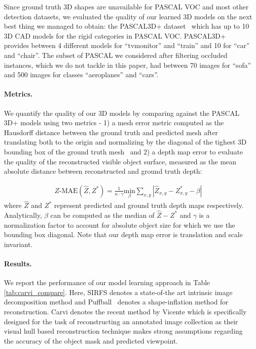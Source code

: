 Since ground truth 3D shapes are unavailable for PASCAL VOC and most other detection datasets, we evaluated the quality of our learned 3D models on the next best thing we managed to obtain: the PASCAL3D+ dataset~\cite{pascal3d} which has up to 10 3D CAD models for the rigid categories in PASCAL VOC. PASCAL3D+ provides between 4 different models for ``tvmonitor'' and ``train'' and 10 for ``car'' and ``chair''.
The subset of PASCAL we considered after filtering occluded instances, which we do not tackle in this paper, had between 70 images for ``sofa'' and 500 images for classes ``aeroplanes'' and ``cars''.


\paragraph{Metrics.} We quantify the quality of our 3D models by comparing against the PASCAL 3D+ models using two metrics - 1) a mesh error metric computed as the Hausdorff distance between the ground truth and predicted mesh after translating both to the origin and normalizing by the diagonal of the tighest 3D bounding box of the ground truth mesh~\cite{aspert2002mesh} and 2) a depth map error to evaluate the quality of the reconstructed visible object surface, measured as the mean absolute distance between reconstructed and ground truth depth:

\begin{gather}
 Z\text{-MAE}(\hat{Z},Z^{*})=\frac{1}{n\cdot\gamma}\underset{\beta}{\text{min}}\underset{x,y}{\sum}|\hat{Z}_{x,y}-Z^*_{x,y}-\beta|
\end{gather}
where $\hat{Z}$ and $Z^*$ represent predicted and ground truth depth maps respectively. Analytically, $\beta$ can be computed as the median of $\hat{Z}-Z^*$ and $\gamma$ is a normalization factor to account for absolute object size for which we use the bounding box diagonal. Note that our depth map error is translation and scale invariant.

\paragraph{Results.}
We report the performance of our model learning approach in Table \ref{tab:carvi_compare}. Here, SIRFS denotes a state-of-the art intrinsic image decomposition method and Puffball~\cite{twarog2012playing} denotes a shape-inflation method for reconstruction.  Carvi denotes the recent method by Vicente \etal \cite{carvi14} which is specifically designed for the task of reconstructing an annotated image collection as their visual hull based reconstruction technique makes strong assumptions regarding the accuracy of the object mask and predicted viewpoint.

